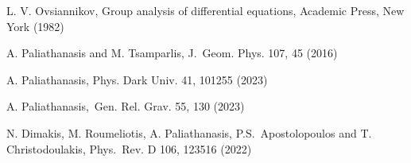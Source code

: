 \documentclass[onecolumn,superscriptaddress,secnumarabic,nobibnotes,aps,prd,nofootinbib,altaffilletter,11pt]{revtex4}
\begin{document}
\begin{thebibliography}{99}
 L. V. Ovsiannikov, Group analysis of differential equations,
Academic Press, New York (1982)

 A. Paliathanasis and M. Tsamparlis, J.\ Geom. Phys. 107, 45
(2016)

 A. Paliathanasis, Phys. Dark Univ. 41, 101255 (2023)

 A. Paliathanasis,\ Gen. Rel. Grav. 55, 130 (2023)

 N. Dimakis, M. Roumeliotis, A. Paliathanasis, P.S.\
Apostolopoulos and T. Christodoulakis, Phys.\ Rev. D 106, 123516 (2022)
\end{thebibliography}
\end{document}
